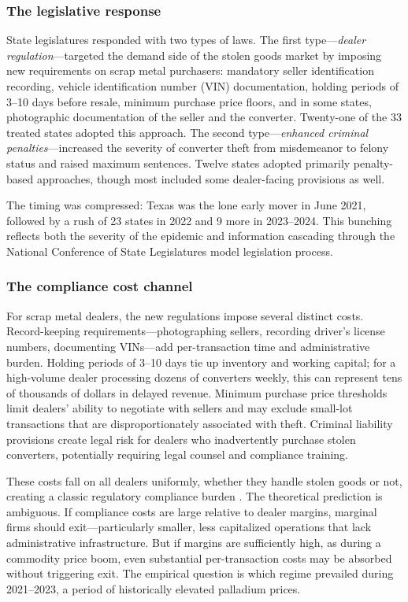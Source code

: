 \documentclass[12pt]{article}
\begin{document}
\subsubsection*{The legislative response} State legislatures responded with two types of laws. The first type---\textit{dealer regulation}---targeted the demand side of the stolen goods market by imposing new requirements on scrap metal purchasers: mandatory seller identification recording, vehicle identification number (VIN) documentation, holding periods of 3--10 days before resale, minimum purchase price floors, and in some states, photographic documentation of the seller and the converter. Twenty-one of the 33 treated states adopted this approach. The second type---\textit{enhanced criminal penalties}---increased the severity of converter theft from misdemeanor to felony status and raised maximum sentences. Twelve states adopted primarily penalty-based approaches, though most included some dealer-facing provisions as well.

The timing was compressed: Texas was the lone early mover in June 2021, followed by a rush of 23 states in 2022 and 9 more in 2023--2024. This bunching reflects both the severity of the epidemic and information cascading through the National Conference of State Legislatures model legislation process.

\subsubsection*{The compliance cost channel} For scrap metal dealers, the new regulations impose several distinct costs. Record-keeping requirements---photographing sellers, recording driver's license numbers, documenting VINs---add per-transaction time and administrative burden. Holding periods of 3--10 days tie up inventory and working capital; for a high-volume dealer processing dozens of converters weekly, this can represent tens of thousands of dollars in delayed revenue. Minimum purchase price thresholds limit dealers' ability to negotiate with sellers and may exclude small-lot transactions that are disproportionately associated with theft. Criminal liability provisions create legal risk for dealers who inadvertently purchase stolen converters, potentially requiring legal counsel and compliance training.

These costs fall on all dealers uniformly, whether they handle stolen goods or not, creating a classic regulatory compliance burden \citep{stigler1971}. The theoretical prediction is ambiguous. If compliance costs are large relative to dealer margins, marginal firms should exit---particularly smaller, less capitalized operations that lack administrative infrastructure. But if margins are sufficiently high, as during a commodity price boom, even substantial per-transaction costs may be absorbed without triggering exit. The empirical question is which regime prevailed during 2021--2023, a period of historically elevated palladium prices.
\end{document}

